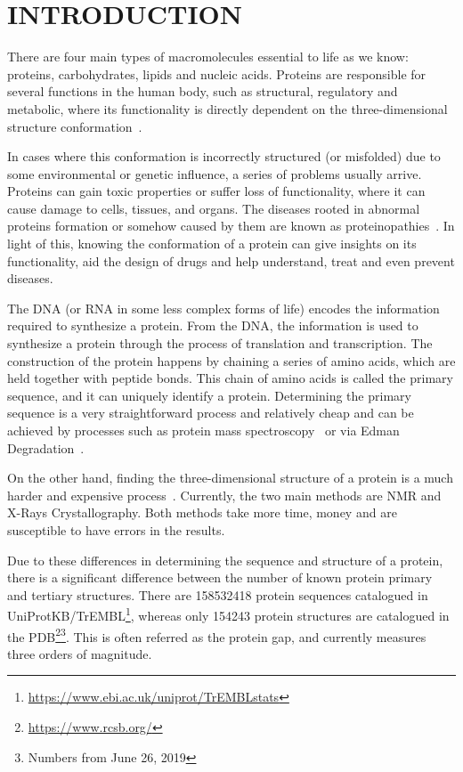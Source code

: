 \chapter{INTRODUCTION}\label{chap:introduction}

There are four main types of macromolecules essential to life as we know: proteins,
carbohydrates, lipids and nucleic acids. Proteins are responsible for several
functions in the human body, such as structural, regulatory and metabolic,
where its functionality is directly dependent on the three-dimensional
structure conformation~\cite{kihara2014protein}.

In cases where this conformation is incorrectly structured (or misfolded) due to
some environmental or genetic influence, a series of problems usually arrive.
Proteins can gain toxic properties or suffer loss of functionality,
where it can cause damage to cells,
tissues, and organs. The diseases rooted in abnormal proteins formation or somehow
caused by them are known as proteinopathies~\cite{shrestha2015yeast}.
In light of this, knowing the conformation of a protein can give insights on its
functionality, aid the design of drugs and help understand, treat and even prevent diseases.

The \ac{DNA} (or \ac{RNA} in some less complex forms of life) encodes the information
required to synthesize a protein. From the \ac{DNA}, the information is used to
synthesize a protein through the process of translation and transcription. The
construction of the protein happens by chaining a series of amino acids, which are
held together with peptide bonds. This chain of amino acids is called the primary
sequence, and it can uniquely identify a protein. Determining the primary
sequence is a very straightforward process and relatively cheap and can be
achieved by processes such as protein mass
spectroscopy~\cite{domon2006mass,covey1999protein}
or via Edman Degradation~\cite{edman1967protein}.

On the other hand, finding the three-dimensional structure of a protein is a
much harder and expensive process~\cite{guntert2004automated}.
Currently, the two main methods are
\acf{NMR} and X-Rays Crystallography. Both methods take more
time, money and are susceptible to have errors in the results.

Due to these differences in determining the sequence and structure of a
protein, there is a significant difference between the number of known protein
primary and tertiary structures. There are \num{158532418} protein sequences 
catalogued in UniProtKB/TrEMBL\footnote{\url{https://www.ebi.ac.uk/uniprot/TrEMBLstats}},
whereas only \num{154243} protein structures are catalogued in
the \ac{PDB}\footnote{\url{https://www.rcsb.org/}}\footnote{Numbers from June 26, 2019}.
This is often referred as the protein gap, and currently measures three orders of magnitude.

